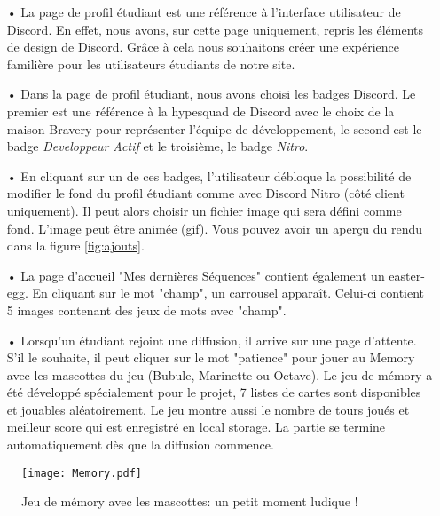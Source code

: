 \begin{itemize}
\setlength\itemsep{1em}
\item[•] La page de profil étudiant est une référence à l'interface utilisateur de Discord. En effet, nous avons, sur cette page uniquement, repris les éléments de design de Discord. Grâce à cela nous souhaitons créer une expérience familière pour les utilisateurs étudiants de notre site.

\item[•] Dans la page de profil étudiant, nous avons choisi les badges Discord. Le premier est une référence à la hypesquad de Discord avec le choix de la maison Bravery pour représenter l'équipe de développement\footnotemark[1], le second est le badge \textit{Developpeur Actif} et le troisième, le badge \textit{Nitro}.

\item[•] En cliquant sur un de ces badges, l'utilisateur débloque la possibilité de modifier le fond du profil étudiant comme avec Discord Nitro (côté client uniquement). Il peut alors choisir un fichier image qui sera défini comme fond. L'image peut être animée (gif). Vous pouvez avoir un aperçu du rendu dans la figure \ref{fig:ajouts}.

\item[•] La page d'accueil "Mes dernières Séquences" contient également un easter-egg. En cliquant sur le mot "champ", un carrousel apparaît. Celui-ci contient 5 images contenant des jeux de mots avec "champ". 

\item[•] Lorsqu'un étudiant rejoint une diffusion, il arrive sur une page d'attente. S'il le souhaite, il peut cliquer sur le mot "patience" pour jouer au Memory avec les mascottes du jeu (Bubule, Marinette ou Octave). Le jeu de mémory a été développé spécialement pour le projet, 7 listes de cartes sont disponibles et jouables aléatoirement. Le jeu montre aussi le nombre de tours joués et meilleur score qui est enregistré en local storage. La partie se termine automatiquement dès que la diffusion commence.
\end{itemize}

\vspace{3mm}
\begin{figure}[H]
\texttt{[image: Memory.pdf]}
\caption{Jeu de mémory avec les mascottes: un petit moment ludique !}
\label{fig:memory}
\centering
\end{figure}

